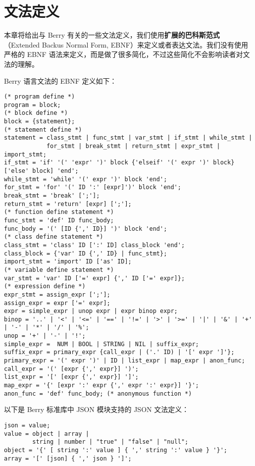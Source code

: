 \chapter{文法定义}

本章将给出与 Berry 有关的一些文法定义，我们使用\textbf{扩展的巴科斯范式}（Extended Backus Normal Form, EBNF）来定义或者表达文法。我们没有使用严格的 EBNF 语法来定义，而是做了很多简化，不过这些简化不会影响读者对文法的理解。

Berry 语言文法的 EBNF 定义如下：

\begin{lstlisting}[language=ebnf]
(* program define *)
program = block;
(* block define *)
block = {statement};
(* statement define *)
statement = class_stmt | func_stmt | var_stmt | if_stmt | while_stmt |
            for_stmt | break_stmt | return_stmt | expr_stmt | import_stmt;
if_stmt = 'if' '(' 'expr' ')' block {'elseif' '(' expr ')' block} ['else' block] 'end';
while_stmt = 'while' '(' expr ')' block 'end';
for_stmt = 'for' '(' ID ':' [expr]')' block 'end';
break_stmt = 'break' [';'];
return_stmt = 'return' [expr] [';'];
(* function define statement *)
func_stmt = 'def' ID func_body;
func_body = '(' [ID {',' ID}] ')' block 'end';
(* class define statement *)
class_stmt = 'class' ID [':' ID] class_block 'end';
class_block = {'var' ID {',' ID} | func_stmt};
import_stmt = 'import' ID ['as' ID];
(* variable define statement *)
var_stmt = 'var' ID ['=' expr] {',' ID ['=' expr]};
(* expression define *)
expr_stmt = assign_expr [';'];
assign_expr = expr ['=' expr];
expr = simple_expr | unop expr | expr binop expr;
binop = '..' | '<' | '<=' | '==' | '!=' | '>' | '>=' | '|' | '&' | '+' | '-' | '*' | '/' | '%';
unop = '+' | '-' | '!';
simple_expr =  NUM | BOOL | STRING | NIL | suffix_expr;
suffix_expr = primary_expr {call_expr | ('.' ID) | '[' expr ']'};
primary_expr = '(' expr ')' | ID | list_expr | map_expr | anon_func;
call_expr = '(' [expr {',' expr}] ')';
list_expr = '[' [expr {',' expr}] ']';
map_expr = '{' [expr ':' expr {',' expr ':' expr}] '}';
anon_func = 'def' func_body; (* anonymous function *)
\end{lstlisting}

以下是 Berry 标准库中 JSON 模块支持的 JSON 文法定义：

\begin{lstlisting}[language=ebnf,morekeywords={string,number}]
json = value;
value = object | array |
        string | number | "true" | "false" | "null";
object = '{' [ string ':' value ] { ',' string ':' value } '}';
array = '[' [json] { ',' json } ']';
\end{lstlisting}
